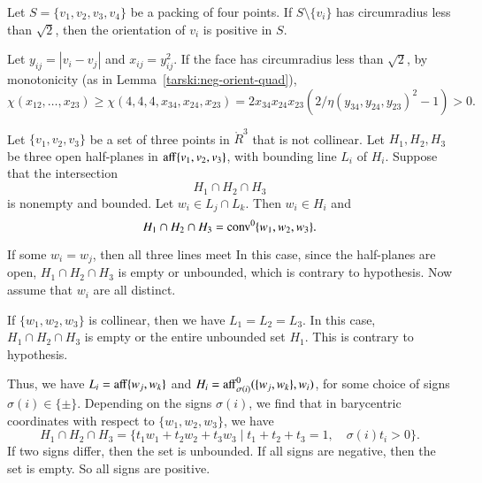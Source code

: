\begin{tarskidata}
\begin{tarski}
\begin{lemma}
%
Let $S=\{v_1,v_2,v_3,v_4\}$ be a packing of four
points.
If $S\setminus\{v_i\}$
has circumradius less than $\sqrt2$, then
the orientation of $v_i$ is positive in $S$.
\end{lemma}

\begin{proved}
Let $y_{ij}=|v_i-v_j|$ and $x_{ij} = y_{ij}^2$.
If the face has circumradius less than $\sqrt2$, by monotonicity (as in Lemma~\ref{tarski:neg-orient-quad}),
    $$\chi(x_{12},\ldots,x_{23}) \ge \chi(4,4,4,x_{34},x_{24},x_{23})
    = 2 x_{34}x_{24}x_{23}
    (2/\eta(y_{34},y_{24},y_{23})^2 - 1) >0.$$
\swallowed\end{proved}
\end{tarski}





\begin{tarski}

\begin{lemma}
Let $\{v_1,v_2,v_3\}$ be a set of three points
in $\ring{R}^3$ that is not collinear.  Let $H_1,H_2,H_3$ be three open half-planes in
${\operatorname{aff}}\{v_1,v_2,v_3\}$, with bounding line $L_i$ of $H_i$.  
Suppose that the intersection
   $$H_1\cap H_2\cap H_3$$
is nonempty and bounded.  Let $w_i\in L_j\cap L_k$.  Then
$w_i\in H_i$ and
   $$H_1\cap H_2\cap H_3 = {\operatorname{conv}}^0\{w_1,w_2,w_3\}.$$
\end{lemma}

\begin{proved}  If some $w_i=w_j$, then all three lines meet
In this case, since the half-planes
are open, $H_1\cap H_2\cap H_3$ is empty or unbounded, which is contrary to 
hypothesis.  Now assume that $w_i$ are all distinct.

If $\{w_1,w_2,w_3\}$ is collinear, then we have $L_1=L_2=L_3$.
In this case, $H_1\cap H_2\cap H_3$ is empty or the entire
unbounded set $H_1$.  This is contrary to hypothesis.

Thus, we have $L_i = {\operatorname{aff}}\{w_j,w_k\}$ and
$H_i = {\operatorname{aff}}^0_{\sigma(i)}(\{w_j,w_k\},w_i)$, for some choice of
signs $\sigma(i)\in\{\pm\}$.  
Depending on the signs $\sigma(i)$, we find that in barycentric
coordinates with respect to $\{w_1,w_2,w_3\}$, we have
  $$H_1\cap H_2\cap H_3 =
    \{ t_1 w_1 + t_2 w_2 +t_3 w_3 \mid
         t_1 + t_2 + t_3 = 1,\quad  \sigma(i)t_i > 0\}.$$
If two signs differ, then the set is unbounded.  If all signs
are negative, then the set is empty.  So all signs are positive.
\swallowed\end{proved}
\end{tarski}







\end{tarskidata}
